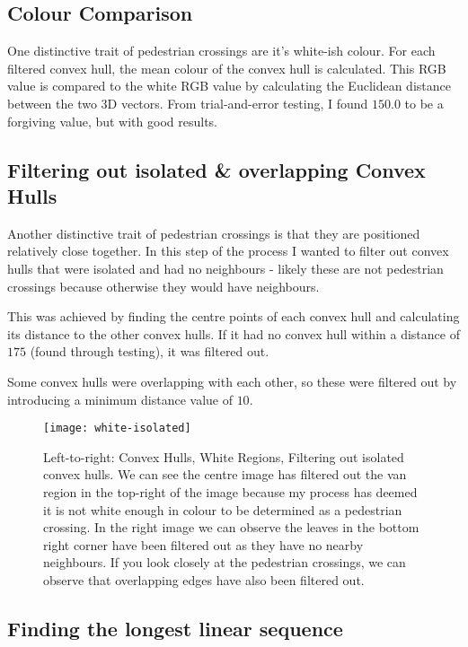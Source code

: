 \documentclass{article}  %
\begin{document}
	\subsection{Colour Comparison}\label{colour-distance}
	
	One distinctive trait of pedestrian crossings are it's white-ish colour. For each filtered convex hull, the mean colour of the convex hull is calculated. This RGB value is compared to the white RGB value by calculating the Euclidean distance between the two 3D vectors. From trial-and-error testing, I found $150.0$ to be a forgiving value, but with good results.
	
	\subsection{Filtering out isolated \& overlapping Convex Hulls}
	
	Another distinctive trait of pedestrian crossings is that they are positioned relatively close together. In this step of the process I wanted to filter out convex hulls that were isolated and had no neighbours - likely these are not pedestrian crossings because otherwise they would have neighbours.
	
	This was achieved by finding the centre points of each convex hull and calculating its distance to the other convex hulls. If it had no convex hull within a distance of $175$ (found through testing), it was filtered out.
	
	Some convex hulls were overlapping with each other, so these were filtered out by introducing a minimum distance value of $10$.
	
	\begin{figure}[H]
		\centering
		\texttt{[image: white-isolated]}
		\caption{Left-to-right: Convex Hulls, White Regions, Filtering out isolated convex hulls. We can see the centre image has filtered out the van region in the top-right of the image because my process has deemed it is not white enough in colour to be determined as a pedestrian crossing. In the right image we can observe the leaves in the bottom right corner have been filtered out as they have no nearby neighbours. If you look closely at the pedestrian crossings, we can observe that overlapping edges have also been filtered out.}
	\end{figure}
	
	\subsection{Finding the longest linear sequence}\label{longest-linear-sequence}
	
\end{document}
